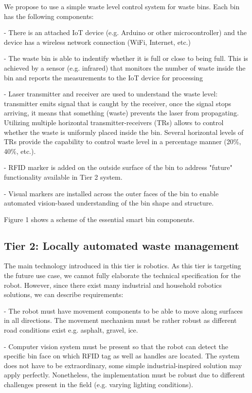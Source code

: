 \documentclass{article}
\begin{document}
We propose to use a simple waste level control system for waste bins. Each bin has the following
components:

- There is an attached IoT device (e.g. Arduino or other microcontroller) and the device has a
wireless network connection (WiFi, Internet, etc.)

- The waste bin is able to indentify whether it is full or close to being full. This is achieved by
a sensor (e.g. infrared) that monitors the number of waste inside the bin and reports the
measurements to the IoT device for processing

- Laser transmitter and receiver are used to understand the waste level: transmitter emits signal
that is caught by the receiver, once the signal stops arriving, it means that something (waste)
prevents the laser from propagating. Utilizing multiple horizontal transmitter-receivers (TRs)
allows to control whether the waste is uniformly placed inside the bin. Several horizontal levels of
TRs provide the capability to control waste level in a percentage manner (20\%, 40\%, etc.).

- RFID marker  is added on the outside surface of the bin to address "future" functionality
available in Tier 2 system.

- Visual markers are installed across the outer faces of the bin to enable automated vision-based
understanding of the bin shape and structure.

Figure 1 shows a scheme of the essential smart bin components.

\subsection{Tier 2: Locally automated waste management}

The main technology introduced in this tier is robotics. As this tier is targeting the future use
case, we cannot fully elaborate the technical specification for the robot. However, since there
exist many industrial and household robotics solutions, we can describe requirements:

- The robot must have movement components to be able to move along surfaces in all directions. The
movement mechanism must be rather robust as different road conditions exist e.g. asphalt, gravel,
ice.

- Computer vision system must be present so that the robot can detect the specific bin face on which
RFID tag as well as handles are located. The system does not have to be extraordinary, some simple
industrial-inspired solution may apply perfectly. Nonetheless, the implementation must be robust due
to different challenges present in the field (e.g. varying lighting conditions).
\end{document}
